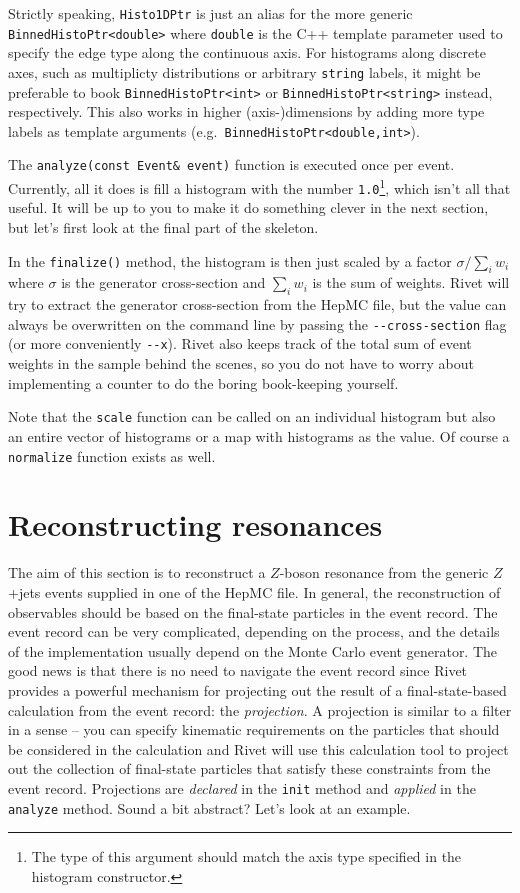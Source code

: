 \documentclass[10pt,fleqn]{scrartcl}
\theoremstyle{exstyle}
\begin{document}
Strictly speaking, \verb|Histo1DPtr| is just an alias for the more generic
\verb|BinnedHistoPtr<double>| where \texttt{double} is the C++ template
parameter used to specify the edge type along the continuous axis. For histograms
along discrete axes, such as multiplicty distributions or arbitrary
\texttt{string} labels, it might be preferable to book \verb|BinnedHistoPtr<int>|
or \verb|BinnedHistoPtr<string>| instead, respectively.
This also works in higher (axis-)dimensions by adding more type labels
as template arguments (e.g.\ \verb|BinnedHistoPtr<double,int>|).

The \verb|analyze(const Event& event)| function is executed once per event.
Currently, all it does is fill a histogram with the number
\verb|1.0|\footnote{The type of this argument should match the axis type specified
in the histogram constructor.}, which isn't all that useful. It will be up to you
to make it do something clever in the next section, but let's first look at the
final part of the skeleton.

In the \verb|finalize()| method, the histogram is then just scaled by a factor
$\sigma/\sum_i w_i$ where $\sigma$ is the generator cross-section and
$\sum_i w_i$ is the sum of weights.
Rivet will try to extract the generator cross-section from the HepMC file,
but the value can always be overwritten on the command line by passing
the \verb|--cross-section| flag (or more conveniently \verb|--x|).
Rivet also keeps track of the total sum of event weights in the sample
behind the scenes, so you do not have to worry about implementing a counter
to do the boring book-keeping yourself.

Note that the \verb|scale| function can be called on an individual histogram
but also an entire vector of histograms or a map with histograms as the value.
Of course a \verb|normalize| function exists as well.


\section{Reconstructing resonances}

The aim of this section is to reconstruct a $Z$-boson resonance from the
generic $Z$+jets events supplied in one of the HepMC file. In general,
the reconstruction of observables should be based on the
final-state particles in the event record. The event record can
be very complicated, depending on the process, and the details of the
implementation usually depend on the Monte Carlo event generator.
The good news is that there is no need to navigate the event record
since Rivet provides a powerful mechanism for projecting out
the result of a final-state-based calculation
from the event record: the \emph{projection}.
A projection is similar to a filter in a sense -- you can specify kinematic
requirements on the particles that should be considered in the calculation
and Rivet will use this calculation tool to project out
the collection of final-state particles that satisfy these constraints
from the event record.
Projections are \emph{declared} in the \verb|init| method and
\emph{applied} in the \verb|analyze| method.
Sound a bit abstract? Let's look at an example.
\end{document}
